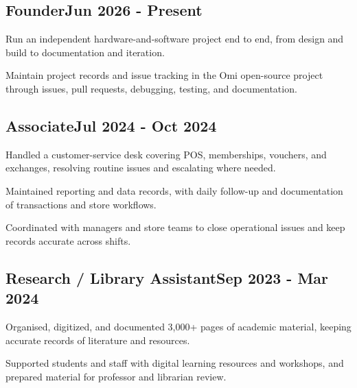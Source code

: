 \documentclass[letter,10pt]{article}
\begin{document}
\subsection{{Founder}\hfill Jun 2026 - Present}
\begin{zitemize}
\item Run an independent hardware-and-software project end to end, from design and build to documentation and iteration.
\item Maintain project records and issue tracking in the Omi open-source project through issues, pull requests, debugging, testing, and documentation.
\end{zitemize}

\vspace*{5pt}
\subsection{{Associate}\hfill Jul 2024 - Oct 2024}
\begin{zitemize}
\item Handled a customer-service desk covering POS, memberships, vouchers, and exchanges, resolving routine issues and escalating where needed.
\item Maintained reporting and data records, with daily follow-up and documentation of transactions and store workflows.
\item Coordinated with managers and store teams to close operational issues and keep records accurate across shifts.
\end{zitemize}

\vspace*{5pt}
\subsection{{Research / Library Assistant}\hfill Sep 2023 - Mar 2024}
\begin{zitemize}
\item Organised, digitized, and documented 3,000+ pages of academic material, keeping accurate records of literature and resources.
\item Supported students and staff with digital learning resources and workshops, and prepared material for professor and librarian review.
\end{zitemize}
\end{document}
